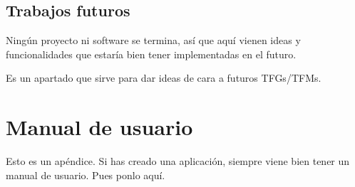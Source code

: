 \documentclass[a4paper, 12pt]{book}
\begin{document}
\section{Trabajos futuros}
\label{sec:trabajos_futuros}

Ningún proyecto ni software se termina, así que aquí vienen ideas y funcionalidades que estaría bien tener implementadas en el futuro.

Es un apartado que sirve para dar ideas de cara a futuros TFGs/TFMs.



\cleardoublepage
\appendix
\chapter{Manual de usuario}
\label{app:manual}

Esto es un apéndice.
Si has creado una aplicación, siempre viene bien tener un manual de usuario.
Pues ponlo aquí.


\cleardoublepage


\end{document}

